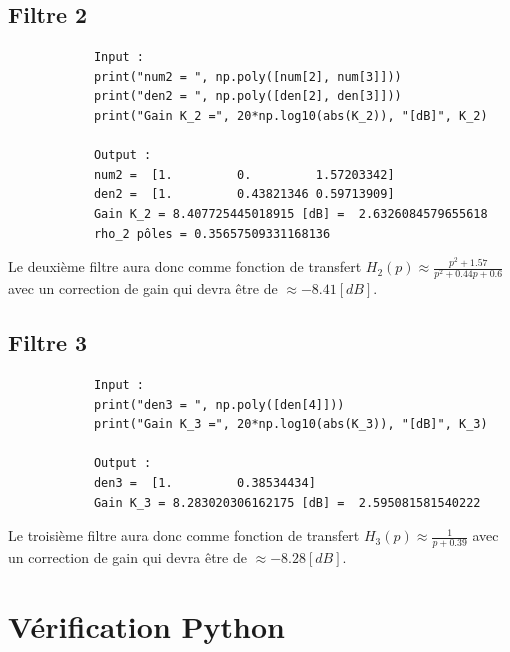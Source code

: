 \documentclass[a4paper,12pt,oneside]{report}	%
\begin{document}
        \subsection{Filtre 2}
            \begin{verbatim}
            Input :
            print("num2 = ", np.poly([num[2], num[3]]))
            print("den2 = ", np.poly([den[2], den[3]]))
            print("Gain K_2 =", 20*np.log10(abs(K_2)), "[dB]", K_2)

            Output :
            num2 =  [1.         0.         1.57203342]
            den2 =  [1.         0.43821346 0.59713909]
            Gain K_2 = 8.407725445018915 [dB] =  2.6326084579655618
            rho_2 pôles = 0.35657509331168136
            \end{verbatim}
            Le deuxième filtre aura donc comme fonction de transfert $H_2(p) \approx \frac{p^2 + 1.57}{p^2 + 0.44p + 0.6}$ avec un correction de gain qui devra être de $\approx -8.41 [dB]$.
        \subsection{Filtre 3}
            \begin{verbatim}
            Input :
            print("den3 = ", np.poly([den[4]]))
            print("Gain K_3 =", 20*np.log10(abs(K_3)), "[dB]", K_3)

            Output :
            den3 =  [1.         0.38534434]
            Gain K_3 = 8.283020306162175 [dB] =  2.595081581540222
            \end{verbatim}
            Le troisième filtre aura donc comme fonction de transfert $H_3(p) \approx \frac{1}{p + 0.39}$ avec un correction de gain qui devra être de $\approx -8.28 [dB]$.
\newpage
    \section{Vérification Python}
\end{document}
